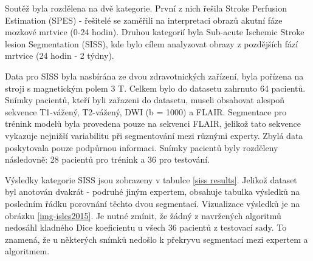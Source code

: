 \documentclass[11pt]{article}
\begin{document}
Soutěž byla rozdělena na dvě kategorie. První z nich řešila Stroke Perfusion Estimation (SPES) - řešitelé se zaměřili na interpretaci obrazů akutní fáze mozkové mrtvice (0-24 hodin). Druhou kategorií byla Sub-acute Ischemic Stroke lesion Segmentation (SISS), kde bylo cílem analyzovat obrazy z pozdějších fází mrtvice (24 hodin - 2 týdny).

Data pro SISS byla nasbírána ze dvou zdravotnických zařízení, byla pořízena na stroji s magnetickým polem 3 T. Celkem bylo do datasetu zahrnuto 64 pacientů. Snímky pacientů, kteří byli zařazeni do datasetu, museli obsahovat alespoň sekvence T1-vážený, T2-vážený, DWI (b = 1000) a FLAIR. Segmentace pro trénink modelů byla provedena pouze na sekvenci FLAIR, jelikož tato sekvence vykazuje nejnižší variabilitu při segmentování mezi různými experty. Zbylá data poskytovala pouze podpůrnou informaci. Snímky pacientů byly rozděleny následovně: 28 pacientů pro trénink a 36 pro testování.

Výsledky kategorie SISS jsou zobrazeny v tabulce \ref{siss results}. Jelikož dataset byl anotován dvakrát - podruhé jiným expertem, obsahuje tabulka výsledků na posledním řádku porovnání těchto dvou segmentací. Vizualizace výsledků je na obrázku \ref{img-isles2015}. Je nutné zmínit, že žádný z navržených algoritmů nedosáhl kladného Dice koeficientu u všech 36 pacientů z testovací sady. To znamená, že u některých snímků nedošlo k překryvu segmentací mezi expertem a algoritmem.
\end{document}
